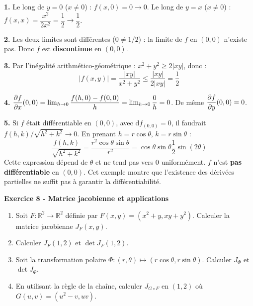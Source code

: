 \documentclass[12pt,a4paper]{article}
\begin{document}
\begin{boitecorrige}
\textbf{1.} Le long de $y=0$ ($x\neq0$) : $f(x,0)=0 \to 0$. Le long de $y=x$ ($x\neq0$) : $f(x,x)=\dfrac{x^2}{2x^2}=\dfrac{1}{2}\to\dfrac{1}{2}$.

\textbf{2.} Les deux limites sont différentes ($0\neq 1/2$) : la limite de $f$ en $(0,0)$ n'existe pas. Donc $f$ est \textbf{discontinue} en $(0,0)$.

\textbf{3.} Par l'inégalité arithmético-géométrique : $x^2 + y^2 \geq 2|xy|$, donc :
\[
|f(x,y)| = \frac{|xy|}{x^2+y^2} \leq \frac{|xy|}{2|xy|} = \frac{1}{2}
\]

\textbf{4.} $\dfrac{\partial f}{\partial x}(0,0) = \lim_{h\to0}\dfrac{f(h,0)-f(0,0)}{h} = \lim_{h\to0}\dfrac{0}{h} = 0$. De même $\dfrac{\partial f}{\partial y}(0,0) = 0$.

\textbf{5.} Si $f$ était différentiable en $(0,0)$, avec $\mathrm{d}f_{(0,0)} = 0$, il faudrait $f(h,k)/\sqrt{h^2+k^2}\to0$. En prenant $h = r\cos\theta$, $k = r\sin\theta$ :
\[
\frac{f(h,k)}{\sqrt{h^2+k^2}} = \frac{r^2\cos\theta\sin\theta}{r^2} = \cos\theta\sin\theta\frac{1}{2}\sin(2\theta)
\]
Cette expression dépend de $\theta$ et ne tend pas vers $0$ uniformément. $f$ n'est \textbf{pas différentiable} en $(0,0)$. Cet exemple montre que l'existence des dérivées partielles ne suffit pas à garantir la différentiabilité.
\end{boitecorrige}

\begin{boiteexercice}
\textbf{Exercice 8 - Matrice jacobienne et applications}\niveau{\moyen}

\begin{enumerate}
  \item Soit $F : \mathbb{R}^2\to\mathbb{R}^2$ définie par $F(x,y) = (x^2+y, xy+y^2)$. Calculer la matrice jacobienne $J_F(x,y)$.
  \item Calculer $J_F(1,2)$ et $\det J_F(1,2)$.
  \item Soit la transformation polaire $\Phi : (r,\theta)\mapsto(r\cos\theta, r\sin\theta)$. Calculer $J_\Phi$ et $\det J_\Phi$.
  \item En utilisant la règle de la chaîne, calculer $J_{G\circ F}$ en $(1,2)$ où $G(u,v) = (u^2-v, uv)$.
\end{enumerate}
\end{boiteexercice}
\end{document}
